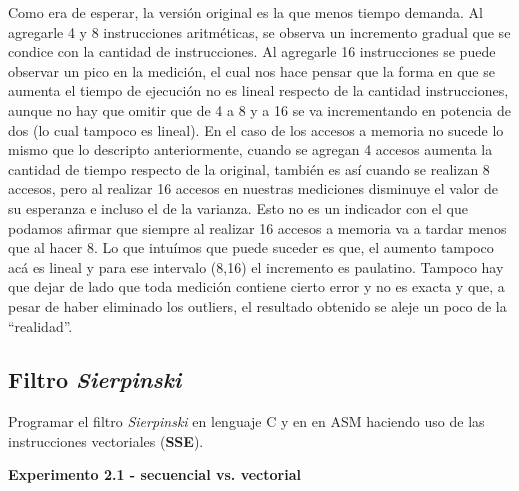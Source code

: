 Como era de esperar, la versión original es la que menos tiempo demanda. Al agregarle 4 y 8 instrucciones aritméticas, se observa un incremento gradual que se condice con la cantidad de instrucciones. Al agregarle 16 instrucciones se puede observar un pico en la medición, el cual nos hace pensar que la forma en que se aumenta el tiempo de ejecución no es lineal respecto de la cantidad instrucciones, aunque no hay que omitir que de 4 a 8 y a 16 se va incrementando en potencia de dos (lo cual tampoco es lineal).  En el caso de los accesos a memoria no sucede lo mismo que lo descripto anteriormente, cuando se agregan 4 accesos aumenta la cantidad de tiempo respecto de la original, también es así cuando se realizan 8 accesos, pero al realizar 16 accesos en nuestras mediciones disminuye el valor de su esperanza e incluso el de la varianza. Esto no es un indicador con el que podamos afirmar que siempre al realizar 16 accesos a memoria va a tardar menos que al hacer 8. Lo que intuímos que puede suceder es que, el aumento tampoco acá es lineal y para ese intervalo (8,16) el incremento es paulatino. Tampoco hay que dejar de lado que toda medición contiene cierto error y no es exacta y que, a pesar de haber eliminado los outliers, el resultado obtenido se aleje un poco de la ``realidad''.

  \newpage
\subsection{Filtro \textit{Sierpinski}}

Programar el filtro \textit{Sierpinski} en lenguaje C y en en ASM haciendo 
uso de las instrucciones vectoriales (\textbf{SSE}).

\vspace*{0.3cm} \noindent
\textbf{Experimento 2.1 - secuencial vs. vectorial}

